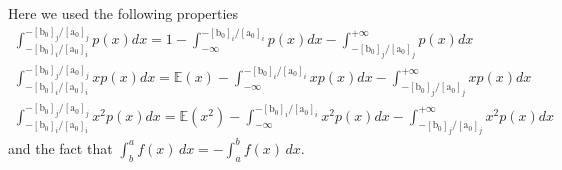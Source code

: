 \documentclass[12pt]{article}
\newcommand{\vect}[1]{\boldsymbol{\mathrm{#1}}}
\newcommand{\expt}[1]{\mathbb{E}\left(#1\right)}
\theoremstyle{remark}
\begin{document}
Here we used the following properties
\begin{align}
	\int_{-[\vect{b_0}]_i/[\vect{a_0}]_i}^{-[\vect{b_0}]_j/[\vect{a_0}]_j} p(x)dx = 1 - \int_{-\infty}^{-[\vect{b_0}]_i/[\vect{a_0}]_i} p(x)dx - \int_{-[\vect{b_0}]_j/[\vect{a_0}]_j}^{+\infty} p(x)dx \\
	\int_{-[\vect{b_0}]_i/[\vect{a_0}]_i}^{-[\vect{b_0}]_j/[\vect{a_0}]_j} xp(x)dx = \expt{x} - \int_{-\infty}^{-[\vect{b_0}]_i/[\vect{a_0}]_i} xp(x)dx - \int_{-[\vect{b_0}]_j/[\vect{a_0}]_j}^{+\infty} xp(x)dx \\
	\int_{-[\vect{b_0}]_i/[\vect{a_0}]_i}^{-[\vect{b_0}]_j/[\vect{a_0}]_j} x^2p(x)dx = \expt{x^2} - \int_{-\infty}^{-[\vect{b_0}]_i/[\vect{a_0}]_i} x^2p(x)dx - \int_{-[\vect{b_0}]_j/[\vect{a_0}]_j}^{+\infty} x^2p(x)dx 
\end{align}
and the fact that $\int_b^a f(x) \, dx = -\int_a^b f(x) \, dx$.
\end{document}
